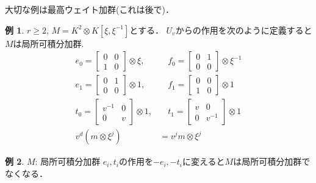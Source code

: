 \documentclass[dvipdfmx,autodetect-engine]{article}
\theoremstyle{definition}
\newtheorem{Ex}{例}
\begin{document}
    大切な例は最高ウェイト加群(これは後で)．
    \begin{Ex}
        $r \geq 2$, $M=K^{2} \otimes K\left[\xi, \xi^{-1}\right]$とする．
        $U_{v}$からの作用を次のように定義すると$M$は局所可積分加群.
        \begin{align*}
            e_{0}=
                \left[ 
                    \begin{array}{ll}
                        {0} & {0} \\ 
                        {1} & {0}
                    \end{array}
                \right]
                \otimes
                \xi,
            &\quad
            f_{0}=
                \left[
                    \begin{array}{ll}
                        {0} & {1} \\
                        {0} & {0}
                    \end{array}
                \right]
                \otimes
                \xi^{-1}\\
            e_{1}=
                \left[ 
                    \begin{array}{ll}
                        {0} & {1} \\ 
                        {0} & {0}
                    \end{array}
                \right]
                \otimes
                1,
            &\quad
            f_{1}=
                \left[
                    \begin{array}{ll}
                        {0} & {0} \\
                        {1} & {0}
                    \end{array}
                \right]
                \otimes
                1\\
            t_{0}=
                \left[
                    \begin{array}{cc}
                        {v^{-1}} & {0} \\
                        {0} & {v}
                    \end{array}
                \right] 
                \otimes
                1, 
            &\quad 
            t_{1}=
                \left[ 
                    \begin{array}{cc}
                        {v} & {0} \\
                        {0} & {v^{-1}}
                    \end{array}
                \right]
                \otimes
                1\\
            v^{d}\left(m \otimes \xi^{j}\right)
            &=v^{j} m \otimes \xi^{j}
        \end{align*}
    \end{Ex}
    \begin{Ex}
        $M$: 局所可積分加群
        $e_i, t_i$の作用を$-e_i, -t_i$に変えると$M$は局所可積分加群でなくなる．
    \end{Ex}
\end{document}
